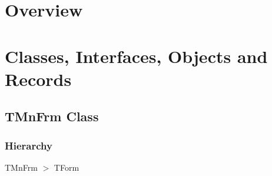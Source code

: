 \documentclass{report}
\newif\ifpdf
\begin{document}
\section{Overview}
\begin{description}
\item[\texttt{\begin{ttfamily}TMnFrm\end{ttfamily} Class}]
\end{description}
\section{Classes, Interfaces, Objects and Records}
\ifpdf
\subsection*{\large{\textbf{TMnFrm Class}}\normalsize\hspace{1ex}\hrulefill}
\else
\subsection*{TMnFrm Class}
\fi
\label{manager.TMnFrm}
\subsubsection*{\large{\textbf{Hierarchy}}\normalsize\hspace{1ex}\hfill}
TMnFrm {$>$} TForm
\end{document}
